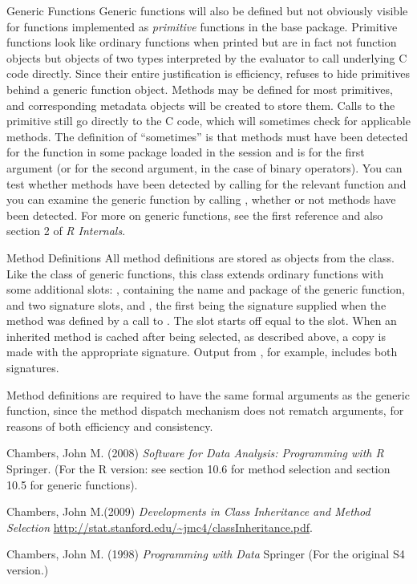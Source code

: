 \begin{Section}{Generic Functions}
Generic functions will also be defined but not obviously visible for
functions implemented as \emph{primitive} functions in the base
package.
Primitive functions look like ordinary functions when printed but are
in fact not function objects but objects of two types interpreted by
the \R{} evaluator to call underlying C code directly.
Since their entire justification is efficiency, \R{} refuses to hide
primitives behind a generic function object.
Methods may be defined for most primitives, and corresponding metadata
objects will be created to store them.
Calls to the primitive still go directly to the C code, which will
sometimes check for applicable methods.
The definition of ``sometimes'' is that methods must have been
detected for the function in some package loaded in the session and
 is  for  the first argument (or for the
second argument, in the case of binary operators).
You can test whether methods have been detected by calling
 for the relevant function and you can examine
the generic function by calling , whether or
not methods have been detected.
For more on generic functions, see the first reference and also section 2 of \emph{R Internals}.

\end{Section}
%
\begin{Section}{Method Definitions}
All method definitions are stored as objects from the
 class.
Like the class of generic functions, this class extends ordinary \R{}
functions with some additional slots: , containing the
name and package of the generic function, and two signature slots,
 and , the first being the signature supplied when
the method was defined by a call to .
The   slot starts off equal to the 
slot.  When an inherited method is cached after being selected, as
described above, a copy is made with the  appropriate   signature.
Output from , for example, includes both
signatures.

Method definitions are required to have the same formal arguments as
the generic function, since the method dispatch mechanism does not
rematch arguments, for reasons of both efficiency and consistency.
\end{Section}
%
\begin{References}\relax
Chambers, John M. (2008)
\emph{Software for Data Analysis: Programming with R}
Springer.  (For the R version: see section 10.6 for method
selection and section 10.5 for generic functions).

Chambers, John M.(2009)
\emph{Developments in Class Inheritance and Method Selection}
\url{http://stat.stanford.edu/~jmc4/classInheritance.pdf}.

Chambers, John M. (1998)
\emph{Programming with Data}
Springer (For the original S4 version.)
\end{References}
